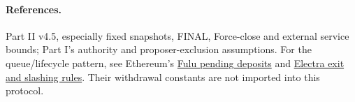 \documentclass[11pt,a4paper]{article}
\begin{document}
\paragraph{References.}
Part II v4.5, especially fixed snapshots, FINAL, Force-close and external
service bounds; Part I's authority and proposer-exclusion assumptions.
For the queue/lifecycle pattern, see Ethereum's
\href{https://ethereum.github.io/consensus-specs/specs/fulu/beacon-chain/}{Fulu pending deposits}
and \href{https://ethereum.github.io/consensus-specs/specs/electra/beacon-chain/}{Electra exit and slashing rules}.
Their withdrawal constants are not imported into this protocol.
\end{document}
